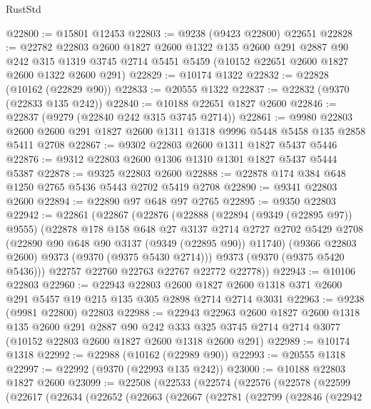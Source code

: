 \begin{lexlean}{RustStd}
\begin{coremodule}
@22800 := @15801 @12453
@22803 := @9238 (@9423 @22800) @22651
@22828 := @22782
    @22803
    @2600
    @1827
    @2600
    @1322
    @135
    @2600
    @291
    @2887
    @90
    @242
    @315
    @1319
    @3745
    @2714
    @5451
    @5459
    (@10152 @22651 @2600 @1827 @2600 @1322 @2600 @291)
@22829 := @10174 @1322
@22832 := @22828 (@10162 (@22829 @90))
@22833 := @20555 @1322
@22837 := @22832 (@9370 (@22833 @135 @242))
@22840 := @10188 @22651 @1827 @2600
@22846 := @22837 (@9279 (@22840 @242 @315 @3745 @2714))
@22861 := @9980
    @22803
    @2600
    @2600
    @291
    @1827
    @2600
    @1311
    @1318
    @9996
    @5448
    @5458
    @135
    @2858
    @5411
    @2708
@22867 := @9302 @22803 @2600 @1311 @1827 @5437 @5446
@22876 := @9312 @22803 @2600 @1306 @1310 @1301 @1827 @5437 @5444 @5387
@22878 := @9325 @22803 @2600
@22888 := @22878 @174 @384 @648 @1250 @2765 @5436 @5443 @2702 @5419 @2708
@22890 := @9341 @22803 @2600
@22894 := @22890 @97 @648 @97 @2765
@22895 := @9350 @22803
@22942 := @22861
    (@22867
      (@22876
        (@22888
          (@22894 (@9349 (@22895 @97)) @9555)
          (@22878
            @178
            @158
            @648
            @27
            @3137
            @2714
            @2727
            @2702
            @5429
            @2708
            (@22890 @90 @648 @90 @3137 (@9349 (@22895 @90)) @11740)
            (@9366 @22803 @2600)
            @9373
            (@9370 (@9375 @5430 @2714)))
          @9373
          (@9370 (@9375 @5420 @5436)))
        @22757
        @22760
        @22763
        @22767
        @22772
        @22778))
@22943 := @10106 @22803
@22960 := @22943
    @22803
    @2600
    @1827
    @2600
    @1318
    @371
    @2600
    @291
    @5457
    @19
    @215
    @135
    @305
    @2898
    @2714
    @2714
    @3031
@22963 := @9238 (@9981 @22800) @22803
@22988 := @22943
    @22963
    @2600
    @1827
    @2600
    @1318
    @135
    @2600
    @291
    @2887
    @90
    @242
    @333
    @325
    @3745
    @2714
    @2714
    @3077
    (@10152 @22803 @2600 @1827 @2600 @1318 @2600 @291)
@22989 := @10174 @1318
@22992 := @22988 (@10162 (@22989 @90))
@22993 := @20555 @1318
@22997 := @22992 (@9370 (@22993 @135 @242))
@23000 := @10188 @22803 @1827 @2600
@23099 := @22508
    (@22533
      (@22574
        (@22576
          (@22578
            (@22599
              (@22617
                (@22634
                  (@22652
                    (@22663
                      (@22667
                        (@22781
                          (@22799
                            (@22846
                              (@22942

\end{coremodule}
\end{lexlean}
